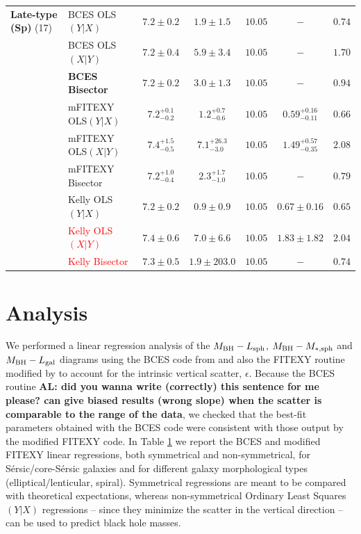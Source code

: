 \documentclass[preprint2]{emulateapj}
\begin{document}
\begin{table}
\begin{tabular}{llccccc}
{\bf Late-type (Sp)} (17)    & BCES OLS$(Y|X)$    & $7.2 \pm 0.2$ & $1.9 \pm 1.5$ & $10.05$ & $-$ & $0.74$ \\ 
                             & BCES OLS$(X|Y)$    & $7.2 \pm 0.4$ & $5.9 \pm 3.4$ & $10.05$ & $-$ & $1.70$ \\
                             & {\bf BCES Bisector}& $\boldsymbol{7.2 \pm 0.2}$ & $\boldsymbol{3.0 \pm 1.3}$ & $\boldsymbol{10.05}$ & $-$ & $\boldsymbol{0.94}$ \\
                             & mFITEXY OLS$(Y|X)$  & $7.2^{+0.1}_{-0.2}$ & $1.2^{+0.7}_{-0.6}$ & $10.05$ & $0.59^{+0.16}_{-0.11}$ & $0.66$ \\
                             & mFITEXY OLS$(X|Y)$  & $7.4^{+1.5}_{-0.5}$ & $7.1^{+26.3}_{-3.0}$ & $10.05$ & $1.49^{+0.57}_{-0.35}$ & $2.08$ \\
                             & mFITEXY Bisector    & $7.2^{+1.0}_{-0.4}$ & $2.3^{+1.7}_{-1.0}$ & $10.05$ & $-$    & $0.79$ \\
                             & Kelly OLS$(Y|X)$  & $7.2 \pm 0.2$ & $0.9 \pm 0.9$ & $10.05$ & $0.67 \pm 0.16$ & $0.65$ \\
                             & \textcolor{red}{Kelly OLS$(X|Y)$}  & $7.4 \pm 0.6$ & $7.0 \pm 6.6$ & $10.05$ & $1.83 \pm 1.82$ & $2.04$ \\
                             & \textcolor{red}{Kelly Bisector}    & $7.3 \pm 0.5$ & $1.9 \pm 203.0$ & $10.05$ & $-$    & $0.74$ \\
                  
\hline 
\hline
\end{tabular}
\label{tab:lreg} 
\end{table}


\section{Analysis}
\label{sec:anal}
We performed a linear regression analysis of the $M_{\rm BH} - L_{\rm sph}$, $M_{\rm BH} - M_{\rm *,sph}$ and $M_{\rm BH} - L_{\rm gal}$ diagrams 
using the BCES code from \cite{akritasbershady1996} 
and also the FITEXY routine \citep{press1992} 
modified by \cite{tremaine2002} to account for the intrinsic vertical scatter, $\epsilon$. 
Because the BCES routine {\bf AL: did you wanna write (correctly) this sentence for me please? 
can give biased results (wrong slope) when the scatter is comparable to the range of the data},
we checked that the best-fit parameters obtained with the BCES code were consistent with those output by the modified FITEXY code.
In Table \ref{tab:lreg} we report the BCES and modified FITEXY linear regressions, both symmetrical and non-symmetrical, 
for S\'ersic/core-S\'ersic galaxies and for different galaxy morphological types (elliptical/lenticular, spiral).
Symmetrical regressions are meant to be compared with theoretical expectations, 
whereas non-symmetrical Ordinary Least Squares $(Y|X)$ regressions -- 
since they minimize the scatter in the vertical direction -- 
can be used to predict black hole masses.
\end{document}
